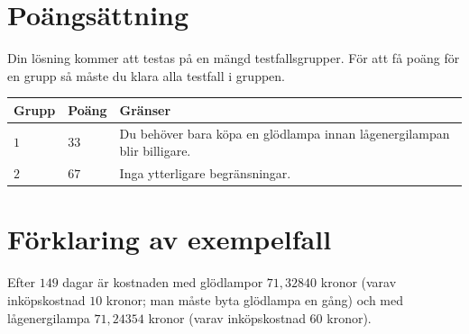 \section*{Poängsättning}
Din lösning kommer att testas på en mängd testfallsgrupper.
För att få poäng för en grupp så måste du klara alla testfall i gruppen.


\noindent
\begin{tabular}{| l | l | p{12cm} |}
  \hline
  \textbf{Grupp} & \textbf{Poäng} & \textbf{Gränser} \\ \hline
  $1$    & $33$        &  Du behöver bara köpa en glödlampa innan lågenergilampan blir billigare. \\ \hline
  $2$    & $67$        & Inga ytterligare begränsningar. \\ \hline
\end{tabular}


\section*{Förklaring av exempelfall}
Efter $149$ dagar är kostnaden med glödlampor $71{,}32840$ kronor (varav inköpskostnad $10$ kronor; man måste byta glödlampa en gång) och med lågenergilampa $71{,}24354$ kronor (varav inköpskostnad $60$ kronor).
